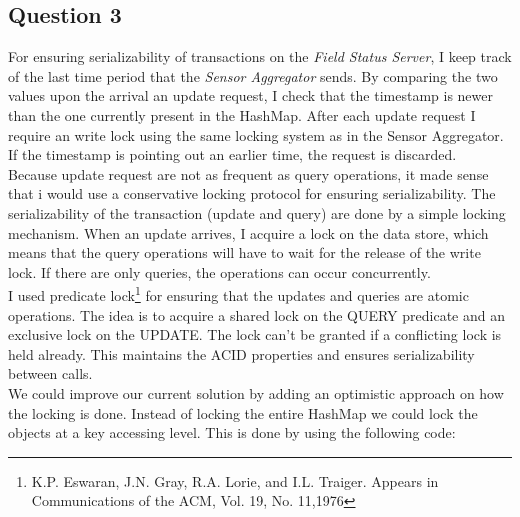 \documentclass{article}      %
\begin{document}
\subsection* {Question 3}

For ensuring serializability of transactions on the \emph{Field Status Server}, I keep track of the last time period that the \emph{Sensor Aggregator} sends. By comparing the two values upon the arrival an update request, I check that the timestamp is newer than the one currently present in the HashMap. After each update request I require an write lock using the same locking system as in the Sensor Aggregator. If the timestamp is pointing out an earlier time, the request is discarded. \\

Because update request are not as frequent as query operations, it made sense that i would use a conservative locking protocol for ensuring serializability. The serializability of the transaction (update and query) are done by a simple locking mechanism. When an update arrives, I acquire a lock on the data store, which means that the query operations will have to wait for the release of the write lock. If there are only queries, the operations can occur concurrently.\\

I used predicate lock\footnote{K.P. Eswaran, J.N. Gray, R.A. Lorie, and I.L. Traiger.
Appears in Communications of the ACM, Vol. 19, No. 11,1976} for ensuring that the updates and queries are atomic operations.  The idea is to acquire a shared lock on the QUERY predicate and an exclusive lock on the UPDATE. The lock can't be granted if a conflicting lock is held already. This maintains the ACID properties and ensures serializability between calls.\\

We could improve our current solution by adding an optimistic approach on how the locking is done. Instead of locking the entire HashMap we could lock the objects at a key accessing level. This is done by using the following code: 
\end{document}
